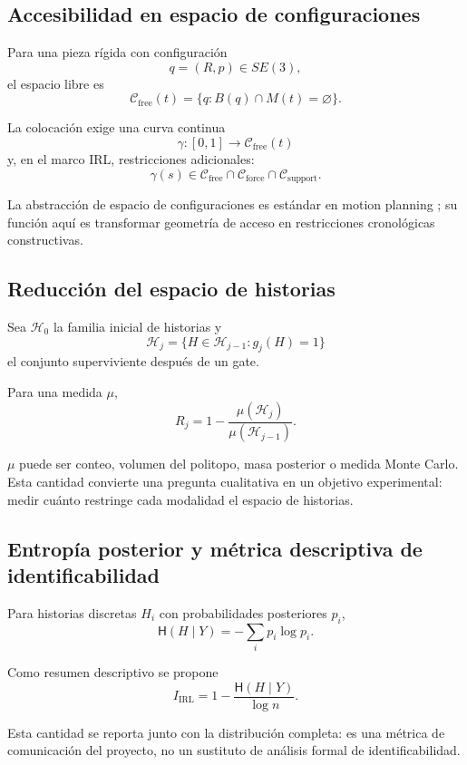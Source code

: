\subsection{Accesibilidad en espacio de configuraciones}

Para una pieza rígida con configuración
\[
q=(R,p)\in SE(3),
\]
el espacio libre es
\[
\mathcal C_{\mathrm{free}}(t)
=
\{
q:
B(q)\cap M(t)=\varnothing
\}.
\]

La colocación exige una curva continua
\[
\gamma:[0,1]\rightarrow\mathcal C_{\mathrm{free}}(t)
\]
y, en el marco IRL, restricciones adicionales:
\[
\gamma(s)
\in
\mathcal C_{\mathrm{free}}
\cap
\mathcal C_{\mathrm{force}}
\cap
\mathcal C_{\mathrm{support}}.
\]

La abstracción de espacio de configuraciones es estándar en motion planning \cite{lavalle2006}; su función aquí es transformar geometría de acceso en restricciones cronológicas constructivas.

\subsection{Reducción del espacio de historias}

Sea \(\mathcal H_0\) la familia inicial de historias y
\[
\mathcal H_j
=
\{
H\in\mathcal H_{j-1}:g_j(H)=1
\}
\]
el conjunto superviviente después de un gate.

Para una medida \(\mu\),
\[
\boxed{
R_j
=
1-
\frac{\mu(\mathcal H_j)}
{\mu(\mathcal H_{j-1})}.
}
\]

\(\mu\) puede ser conteo, volumen del politopo, masa posterior o medida Monte Carlo. Esta cantidad convierte una pregunta cualitativa en un objetivo experimental: medir cuánto restringe cada modalidad el espacio de historias.

\subsection{Entropía posterior y métrica descriptiva de identificabilidad}

Para historias discretas \(H_i\) con probabilidades posteriores \(p_i\),
\[
\mathsf H(H\mid Y)
=
-\sum_i p_i\log p_i.
\]

Como resumen descriptivo se propone
\[
\boxed{
I_{\mathrm{IRL}}
=
1-
\frac{\mathsf H(H\mid Y)}
{\log n}.
}
\]

Esta cantidad se reporta junto con la distribución completa: es una métrica de comunicación del proyecto, no un sustituto de análisis formal de identificabilidad.

